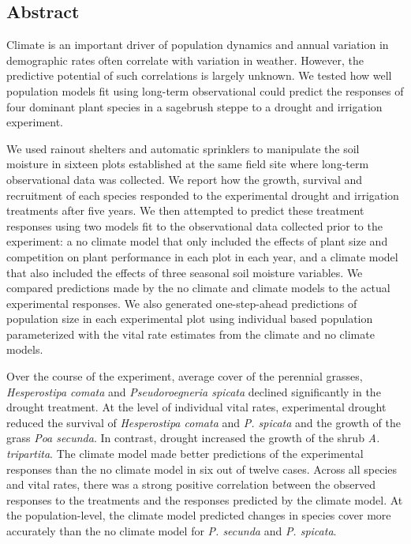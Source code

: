 \documentclass[11pt]{article}
\begin{document}
\begin{doublespace}

\linenumbers

\section*{Abstract}

Climate is an important driver of population dynamics and annual variation in demographic rates often correlate with variation in weather. However, the predictive potential of such correlations is largely unknown. We tested how well population models fit using long-term observational could predict the responses of four dominant plant species in a sagebrush steppe to a drought and irrigation experiment. 

We used rainout shelters and automatic sprinklers to manipulate the soil moisture in sixteen plots established at the same field site where long-term observational data was collected. We report how the growth, survival and recruitment of each species responded to the experimental drought and irrigation treatments after five years. We then attempted to predict these treatment responses using two models fit to the observational data collected prior to the experiment: a no climate model that only included the effects of plant size and competition on plant performance in each plot in each year, and a climate model that also included the effects of three seasonal soil moisture variables. We compared predictions made by the no climate and climate models to the actual experimental responses. We also generated one-step-ahead predictions of population size in each experimental plot using individual based population parameterized with the vital rate estimates from the climate and no climate models. 

Over the course of the experiment, average cover of the perennial grasses, \textit{Hesperostipa comata} and \textit{Pseudoroegneria spicata} declined significantly in the drought treatment. At the level of individual vital rates, experimental drought reduced the survival of \textit{Hesperostipa comata} and \textit{P. spicata} and the growth of the grass \textit{Poa secunda}. In contrast, drought increased the growth of the shrub \textit{A. tripartita}. The climate model made better predictions of the experimental responses than the no climate model in six out of twelve cases. Across all species and vital rates, there was a strong positive correlation between the observed responses to the treatments and the responses predicted by the climate model. At the population-level, the climate model predicted changes in species cover more accurately than the no climate model for \textit{P. secunda} and \textit{P. spicata}. 


\end{doublespace}
\end{document}
